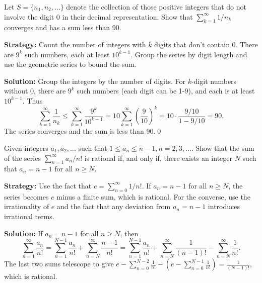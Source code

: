 \begin{problembox}
\begin{problemstatement}
Let \(S = \{n_1, n_2, \ldots\}\) denote the collection of those positive integers that do not involve the digit 0 in their decimal representation. Show that \(\sum_{k=1}^{\infty} 1/n_k\) converges and has a sum less than 90.
\end{problemstatement}
\end{problembox}

\noindent\textbf{Strategy:} Count the number of integers with \(k\) digits that don't contain 0. There are \(9^k\) such numbers, each at least \(10^{k-1}\). Group the series by digit length and use the geometric series to bound the sum.

\bigskip\noindent\textbf{Solution:}
Group the integers by the number of digits. For \(k\)-digit numbers without 0, there are \(9^k\) such numbers (each digit can be 1-9), and each is at least \(10^{k-1}\). Thus
\[\sum_{k=1}^{\infty} \frac{1}{n_k} \leq \sum_{k=1}^{\infty} \frac{9^k}{10^{k-1}} = 10 \sum_{k=1}^{\infty} \left(\frac{9}{10}\right)^k = 10 \cdot \frac{9/10}{1-9/10} = 90.\]
The series converges and the sum is less than 90.\qed



\begin{problembox}
\begin{problemstatement}
Given integers \(a_1, a_2, \ldots\) such that \(1 \leq a_n \leq n - 1, n = 2, 3, \ldots\). Show that the sum of the series \(\sum_{n=1}^{\infty} a_n / n!\) is rational if, and only if, there exists an integer \(N\) such that \(a_n = n - 1\) for all \(n \geq N\).
\end{problemstatement}
\end{problembox}

\noindent\textbf{Strategy:} Use the fact that \(e=\sum_{n=0}^{\infty} 1/n!\). If \(a_n=n-1\) for all \(n\ge N\), the series becomes \(e\) minus a finite sum, which is rational. For the converse, use the irrationality of \(e\) and the fact that any deviation from \(a_n=n-1\) introduces irrational terms.

\bigskip\noindent\textbf{Solution:}
If \(a_n = n-1\) for all \(n \geq N\), then
\[\sum_{n=1}^{\infty} \frac{a_n}{n!} = \sum_{n=1}^{N-1} \frac{a_n}{n!} + \sum_{n=N}^{\infty} \frac{n-1}{n!} = \sum_{n=1}^{N-1} \frac{a_n}{n!} + \sum_{n=N}^{\infty} \frac{1}{(n-1)!} - \sum_{n=N}^{\infty} \frac{1}{n!}.\]
The last two sums telescope to give \(e - \sum_{n=0}^{N-2} \frac{1}{n!} - (e - \sum_{n=0}^{N-1} \frac{1}{n!}) = \frac{1}{(N-1)!}\), which is rational.

